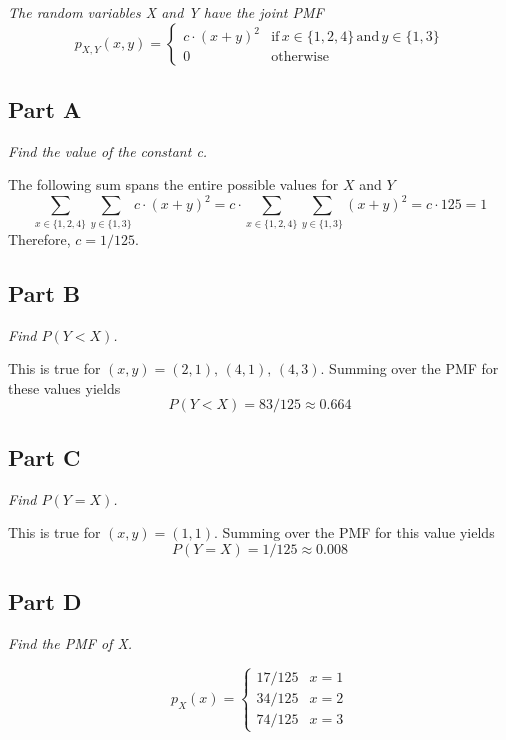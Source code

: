 \documentclass{article}
\begin{document}
\textit{The random variables X and Y have the joint PMF}
$$ p_{X,Y}(x, y) = \begin{cases}
    c \cdot (x + y)^2 & \mathrm{if}\, x \in \{ 1, 2, 4 \}\, \mathrm{and}\, y
    \in \{ 1, 3 \} \\
    0 & \mathrm{otherwise}
\end{cases} $$

\subsection*{Part A}

\textit{Find the value of the constant c.}

\bigbreak

The following sum spans the entire possible values for $ X $ and $ Y $
$$ \sum\limits_{x \in \{ 1, 2, 4 \}} \sum\limits_{y \in \{ 1, 3 \}} c \cdot
(x + y)^2 = c \cdot \sum\limits_{x \in \{ 1, 2, 4 \}} \sum\limits_{y \in \{
1, 3 \}} (x + y)^2  = c \cdot 125 = 1$$
Therefore, $ c = 1/125 $.

\subsection*{Part B}

\textit{Find $ P(Y < X) $.}

\bigbreak

This is true for $ (x, y) = (2, 1),\, (4, 1),\, (4, 3) $. Summing over the
PMF for these values yields
$$ P(Y < X) = 83/125 \approx 0.664 $$

\subsection*{Part C}

\textit{Find $ P(Y = X) $.}

\bigbreak

This is true for $ (x, y) = (1, 1) $. Summing over the PMF for this value yields
$$ P(Y = X) = 1/125 \approx 0.008 $$

\subsection*{Part D}

\textit{Find the PMF of X.}

$$ p_X(x) = \begin{cases}
    17/125 & x = 1 \\
    34/125 & x = 2 \\
    74/125 & x = 3
\end{cases} $$
\end{document}
